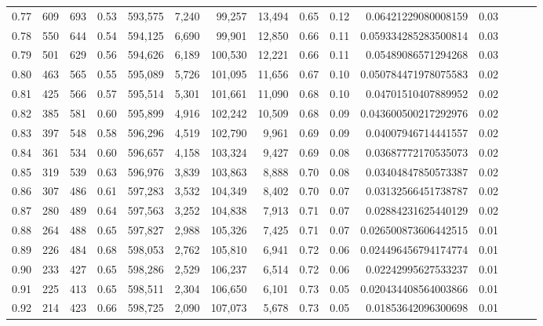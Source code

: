 \begin{tabular}{rrrrrrrrrrrrrrr}
0.77 &     609 &    693 &  0.53 &  593,575 &    7,240 &   99,257 &   13,494 &  0.65 &  0.12 &   0.06421229080008159 &      0.03 \\
0.78 &     550 &    644 &  0.54 &  594,125 &    6,690 &   99,901 &   12,850 &  0.66 &  0.11 &  0.059334285283500814 &      0.03 \\
0.79 &     501 &    629 &  0.56 &  594,626 &    6,189 &  100,530 &   12,221 &  0.66 &  0.11 &   0.05489086571294268 &      0.03 \\
0.80 &     463 &    565 &  0.55 &  595,089 &    5,726 &  101,095 &   11,656 &  0.67 &  0.10 &  0.050784471978075583 &      0.02 \\
0.81 &     425 &    566 &  0.57 &  595,514 &    5,301 &  101,661 &   11,090 &  0.68 &  0.10 &   0.04701510407889952 &      0.02 \\
0.82 &     385 &    581 &  0.60 &  595,899 &    4,916 &  102,242 &   10,509 &  0.68 &  0.09 &  0.043600500217292976 &      0.02 \\
0.83 &     397 &    548 &  0.58 &  596,296 &    4,519 &  102,790 &    9,961 &  0.69 &  0.09 &   0.04007946714441557 &      0.02 \\
0.84 &     361 &    534 &  0.60 &  596,657 &    4,158 &  103,324 &    9,427 &  0.69 &  0.08 &   0.03687772170535073 &      0.02 \\
0.85 &     319 &    539 &  0.63 &  596,976 &    3,839 &  103,863 &    8,888 &  0.70 &  0.08 &   0.03404847850573387 &      0.02 \\
0.86 &     307 &    486 &  0.61 &  597,283 &    3,532 &  104,349 &    8,402 &  0.70 &  0.07 &   0.03132566451738787 &      0.02 \\
0.87 &     280 &    489 &  0.64 &  597,563 &    3,252 &  104,838 &    7,913 &  0.71 &  0.07 &   0.02884231625440129 &      0.02 \\
0.88 &     264 &    488 &  0.65 &  597,827 &    2,988 &  105,326 &    7,425 &  0.71 &  0.07 &  0.026500873606442515 &      0.01 \\
0.89 &     226 &    484 &  0.68 &  598,053 &    2,762 &  105,810 &    6,941 &  0.72 &  0.06 &  0.024496456794174774 &      0.01 \\
0.90 &     233 &    427 &  0.65 &  598,286 &    2,529 &  106,237 &    6,514 &  0.72 &  0.06 &   0.02242995627533237 &      0.01 \\
0.91 &     225 &    413 &  0.65 &  598,511 &    2,304 &  106,650 &    6,101 &  0.73 &  0.05 &  0.020434408564003866 &      0.01 \\
0.92 &     214 &    423 &  0.66 &  598,725 &    2,090 &  107,073 &    5,678 &  0.73 &  0.05 &   0.01853642096300698 &      0.01 \\

\end{tabular}
